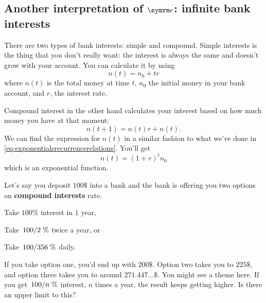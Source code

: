 \subsection{\protect Another interpretation of $\e$: infinite bank interests}

There are two types of bank interests: simple and compound. Simple interests is the thing that you don't really want: the interest is always the same and doesn't grow with your account. You can calculate it by using
\begin{equation}
    n(t) = n_0 + tr
\end{equation}
where $n(t)$ is the total money at time $t$, $n_0$ the initial money in your bank account, and $r$, the interest rate.

Compound interest in the other hand calculates your interest based on how much money you have at that moment:
\begin{equation}
    n(t + 1) = n(t)r + n(t).
\end{equation}
We can find the expression for $n(t)$ in a similar fashion to what we've done in \cref{eq:exponentialsrecurrencerelations}. You'll get
\begin{equation}
    n(t) = (1 + r)^tn_0 \label{eq:compoundinterestformula}
\end{equation}
which is an exponential function.

Let's say you deposit $100\$$ into a bank and the bank is offering you two options on \textbf{compound interests} rate. \begin{enumerate*}[label = \arabic*)]\item Take $100\%$ interest in $1$ year, \item Take $\flatfrac{100}{2}\%$ twice a year, or \item Take $\flatfrac{100}{356}\%$ daily.\end{enumerate*} If you take option one, you'd end up with $200\$$. Option two takes you to $225\$$, and option three takes you to around $271.447\dots\$$. You might see a theme here. If you get $\flatfrac{100}{n}\%$ interest, $n$ times a year, the result keeps getting higher. Is there an upper limit to this?

